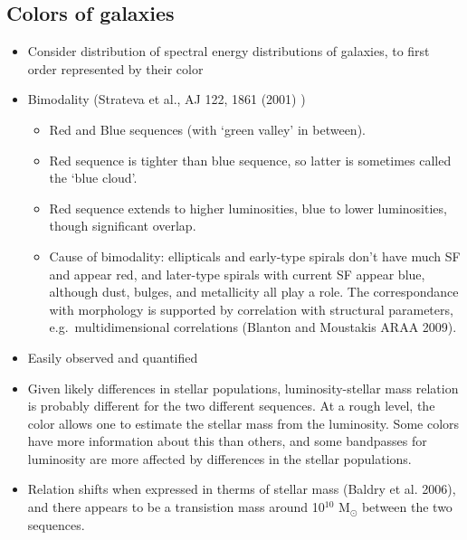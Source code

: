 \documentclass[12pt]{article}
\begin{document}
\subsection*{Colors of galaxies}
  \begin{itemize}
    \item Consider distribution of spectral energy distributions of
    galaxies, to first order represented by their color
    \item Bimodality (Strateva et al., AJ 122, 1861 (2001) )
    \begin{itemize}
      \item Red and Blue sequences (with `green valley' in between).
      \item Red sequence is tighter than blue sequence, so latter is
      sometimes called the `blue cloud'.
      \item Red sequence extends to higher luminosities, blue to lower
      luminosities, though significant overlap.
      \item Cause of bimodality: ellipticals and early-type spirals
      don't have much SF and appear red, and later-type spirals with
      current SF appear blue, although dust, bulges, and metallicity
      all play a role. The correspondance with morphology is supported
      by correlation with structural parameters, e.g.\ multidimensional
      correlations (Blanton and Moustakis ARAA 2009).
    \end{itemize}
    \item Easily observed and quantified
    \item Given likely differences in stellar populations,
    luminosity-stellar mass relation is probably different for the two
    different sequences. At a rough level, the color allows one to
    estimate the stellar mass from the luminosity. Some colors have
    more information about this than others, and some bandpasses for
    luminosity are more affected by differences in the stellar
    populations.
    \item Relation shifts when expressed in therms of stellar mass
    (Baldry et al. 2006), and there appears to be a transistion mass
    around 10$^{10}$ M$_{\odot}$ between the two sequences.
  \end{itemize}
\end{document}
